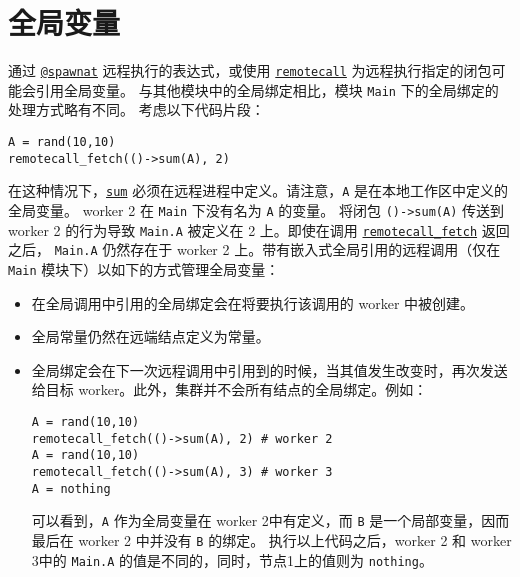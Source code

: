\hypertarget{17299710876257759093}{}


\section{全局变量}



通过 \hyperlink{11231712027010946923}{\texttt{@spawnat}} 远程执行的表达式，或使用 \hyperlink{5405028821457292937}{\texttt{remotecall}} 为远程执行指定的闭包可能会引用全局变量。 与其他模块中的全局绑定相比，模块 \texttt{Main} 下的全局绑定的处理方式略有不同。 考虑以下代码片段：




\begin{verbatim}
A = rand(10,10)
remotecall_fetch(()->sum(A), 2)
\end{verbatim}



在这种情况下，\hyperlink{8666686648688281595}{\texttt{sum}} 必须在远程进程中定义。请注意，\texttt{A} 是在本地工作区中定义的全局变量。 worker 2 在 \texttt{Main} 下没有名为 \texttt{A} 的变量。 将闭包 \texttt{()->sum(A)} 传送到 worker 2 的行为导致 \texttt{Main.A} 被定义在 2 上。即使在调用 \hyperlink{17262349333771600150}{\texttt{remotecall\_fetch}} 返回之后， \texttt{Main.A} 仍然存在于 worker 2 上。带有嵌入式全局引用的远程调用（仅在\texttt{Main} 模块下）以如下的方式管理全局变量：



\begin{itemize}
\item 在全局调用中引用的全局绑定会在将要执行该调用的 worker 中被创建。


\item 全局常量仍然在远端结点定义为常量。


\item 全局绑定会在下一次远程调用中引用到的时候，当其值发生改变时，再次发送给目标 worker。此外，集群并不会所有结点的全局绑定。例如：


\begin{verbatim}
A = rand(10,10)
remotecall_fetch(()->sum(A), 2) # worker 2
A = rand(10,10)
remotecall_fetch(()->sum(A), 3) # worker 3
A = nothing
\end{verbatim}

可以看到，\texttt{A} 作为全局变量在 worker 2中有定义，而 \texttt{B} 是一个局部变量，因而最后在 worker 2 中并没有 \texttt{B} 的绑定。 执行以上代码之后，worker 2 和 worker 3中的 \texttt{Main.A} 的值是不同的，同时，节点1上的值则为 \texttt{nothing}。

\end{itemize}


